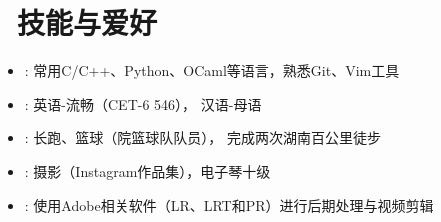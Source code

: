 \documentclass{resume}
\begin{document}
\section{\faTasks\ 技能与爱好}

\begin{itemize}[parsep=0.5ex]
  \item {}: 常用C/C++、Python、OCaml等语言，熟悉Git、Vim工具
  \item {}: 英语-流畅（CET-6 546）， 汉语-母语
  \item {}: 长跑、篮球（院篮球队队员）， 完成两次湖南百公里徒步
  \item {}: 摄影（Instagram作品集），电子琴十级
  \item {}: 使用Adobe相关软件（LR、LRT和PR）进行后期处理与视频剪辑
\end{itemize}



\end{document}
